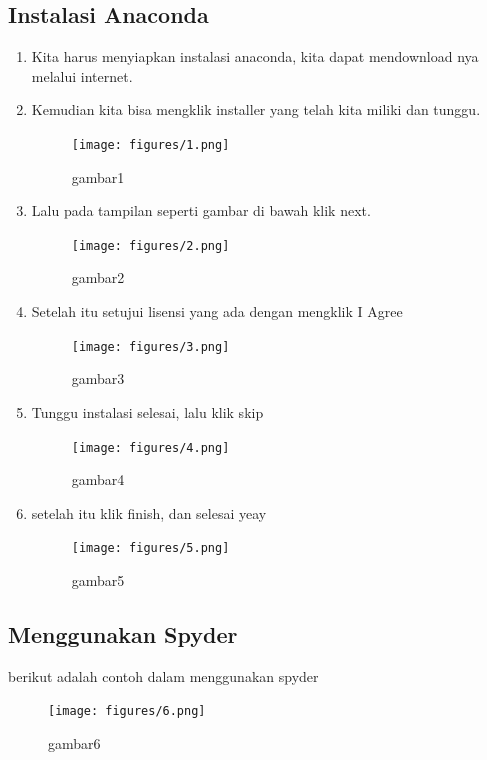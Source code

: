 \subsection{Instalasi Anaconda}
\begin{enumerate}
    \item Kita harus menyiapkan instalasi anaconda, kita dapat mendownload nya melalui internet.
    \item Kemudian kita bisa mengklik installer yang telah kita miliki dan tunggu.
    \begin{figure}[!Htbp]
        \centering
        \texttt{[image: figures/1.png]}
        \caption{gambar1}
        \label{awal}
        \end{figure}

    \item Lalu pada tampilan seperti gambar di bawah klik next.
    \begin{figure}[!htbp]
        \centering
        \texttt{[image: figures/2.png]}
        \caption{gambar2}
        \label{next}
        \end{figure}

    \item Setelah itu setujui lisensi yang ada dengan mengklik I Agree
    \begin{figure}[!htbp]
        \centering
        \texttt{[image: figures/3.png]}
        \caption{gambar3}
        \label{lisensi}
        \end{figure}

    \item Tunggu instalasi selesai, lalu klik skip
    \begin{figure}[!htbp]
        \centering
        \texttt{[image: figures/4.png]}
        \caption{gambar4}
        \label{skip}
        \end{figure}

    \item setelah itu klik finish, dan selesai yeay
    \begin{figure}[!htbp]
        \centering
        \texttt{[image: figures/5.png]}
        \caption{gambar5}
        \label{selesai}
        \end{figure}
\end{enumerate}

\subsection{Menggunakan Spyder}
berikut adalah contoh dalam menggunakan spyder
\begin{figure}[!htbp]
    \centering
    \texttt{[image: figures/6.png]}
    \caption{gambar6}
    \label{spyder}
    \end{figure}
